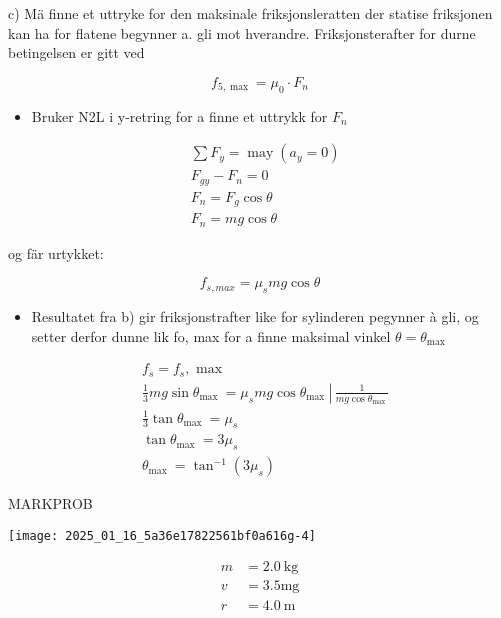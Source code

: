 \documentclass[10pt]{article}
\begin{document}
c) Mä finne et uttryke for den maksinale friksjonsleratten der statise friksjonen kan ha for flatene begynner a. gli mot hverandre. Friksjonsterafter for durne betingelsen er gitt ved

$$
f_{5, \max }=\mu_{0} \cdot F_{n}
$$

\begin{itemize}
  \item Bruker N2L i y-retring for a finne et uttrykk for $F_{n}$
\end{itemize}

$$
\begin{aligned}
& \sum F_{y}=\operatorname{may}\left(a_{y}=0\right) \\
& F_{g y}-F_{n}=0 \\
& F_{n}=F_{g} \cos \theta \\
& F_{n}=m g \cos \theta
\end{aligned}
$$

og fär urtykket:

$$
f_{s, m a x}=\mu_{s} m g \cos \theta
$$

\begin{itemize}
  \item Resultatet fra b) gir friksjonstrafter like for sylinderen pegynner à gli, og setter derfor dunne lik fo, max for a finne maksimal vinkel $\theta=\theta_{\text {max }}$
\end{itemize}

$$
\begin{aligned}
& f_{s}=f_{s}, \text { max } \\
& \left.\frac{1}{3} m g \sin \theta_{\text {max }}=\mu_{s} m g \cos \theta_{\text {max }} \right\rvert\, \frac{1}{m g \cos \theta_{\text {max }}} \\
& \frac{1}{3} \tan \theta_{\text {max }}=\mu_{s} \\
& \tan \theta_{\text {max }}=3 \mu_{s} \\
& \theta_{\text {max }}=\tan ^{-1}\left(3 \mu_{s}\right)
\end{aligned}
$$

MARKPROB

\begin{center}
\texttt{[image: 2025\_01\_16\_5a36e17822561bf0a616g-4]}
\end{center}

$$
\begin{aligned}
m & =2.0 \mathrm{~kg} \\
v & =3.5 \mathrm{mg} \\
r & =4.0 \mathrm{~m}
\end{aligned}
$$
\end{document}
